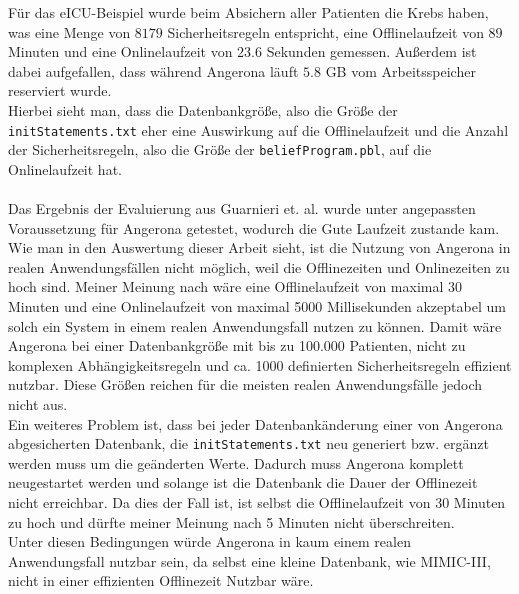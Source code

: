 \documentclass[german,version-2020-11]{uzl-thesis}
\begin{document}
Für das eICU-Beispiel wurde beim Absichern aller Patienten die Krebs haben, was eine Menge von $8179$ Sicherheitsregeln entspricht, eine Offlinelaufzeit von $89$ Minuten und eine Onlinelaufzeit von $23.6$ Sekunden gemessen. Außerdem ist dabei aufgefallen, dass während Angerona läuft $5.8$ GB vom Arbeitsspeicher reserviert wurde. \\ 
Hierbei sieht man, dass die Datenbankgröße, also die Größe der \texttt{initStatements.txt} eher eine Auswirkung auf die Offlinelaufzeit und die Anzahl der Sicherheitsregeln, also die Größe der \texttt{beliefProgram.pbl}, auf die Onlinelaufzeit hat. \\ \\ 
Das Ergebnis der Evaluierung aus Guarnieri et. al. \cite{guarnieri2017securing} wurde unter angepassten Voraussetzung für Angerona getestet, wodurch die Gute Laufzeit zustande kam. Wie man in den Auswertung dieser Arbeit sieht, ist die Nutzung von Angerona in realen Anwendungsfällen nicht möglich, weil die Offlinezeiten und Onlinezeiten zu hoch sind. Meiner Meinung nach wäre eine Offlinelaufzeit von maximal 30 Minuten und eine Onlinelaufzeit von maximal 5000 Millisekunden akzeptabel um solch ein System in einem realen Anwendungsfall nutzen zu können. Damit wäre Angerona bei einer Datenbankgröße mit bis zu 100.000 Patienten, nicht zu komplexen Abhängigkeitsregeln und ca. 1000 definierten Sicherheitsregeln effizient nutzbar. Diese Größen reichen für die meisten realen Anwendungsfälle jedoch nicht aus. \\ 
Ein weiteres Problem ist, dass bei jeder Datenbankänderung einer von Angerona abgesicherten Datenbank, die \texttt{initStatements.txt} neu generiert bzw. ergänzt werden muss um die geänderten Werte. Dadurch muss Angerona komplett neugestartet werden und solange ist die Datenbank die Dauer der Offlinezeit nicht erreichbar. Da dies der Fall ist, ist selbst die Offlinelaufzeit von 30 Minuten zu hoch und dürfte meiner Meinung nach 5 Minuten nicht überschreiten. \\ Unter diesen Bedingungen würde Angerona in kaum einem realen Anwendungsfall nutzbar sein, da selbst eine kleine Datenbank, wie MIMIC-III, nicht in einer effizienten Offlinezeit Nutzbar wäre.
\end{document}
